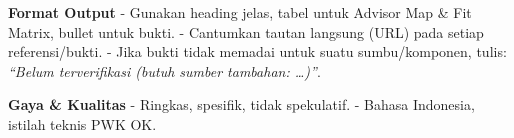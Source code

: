\documentclass[
  indonesian,
]{article}
\begin{document}
\textbf{Format Output} - Gunakan heading jelas, tabel untuk Advisor Map
\& Fit Matrix, bullet untuk bukti. - Cantumkan tautan langsung (URL)
pada setiap referensi/bukti. - Jika bukti tidak memadai untuk suatu
sumbu/komponen, tulis: \emph{``Belum terverifikasi (butuh sumber
tambahan: \ldots)''}.

\textbf{Gaya \& Kualitas} - Ringkas, spesifik, tidak spekulatif. -
Bahasa Indonesia, istilah teknis PWK OK.
\end{document}
